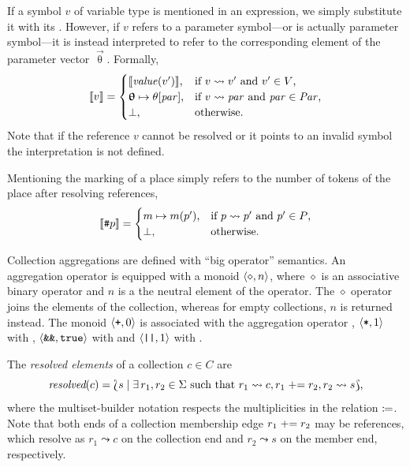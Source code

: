If a symbol \(v\) of variable type is mentioned in an expression, we simply substitute it with its . However, if \(v\) refers to a parameter symbol---or is actually parameter symbol---it is instead interpreted to refer to the corresponding element of the parameter vector \(\vec{\uptheta}\). Formally,
\begin{equation}
  \llbracket v \rrbracket = \begin{cases}
    \llbracket \textrm{\itshape value\/}(v') \rrbracket \text, & \text{if \(v \leadsto v'\) and \(v' \in V\),} \\
    \bm{\mathrm{\uptheta}} \mapsto \theta[\textrm{\itshape par\/}] \text, & \text{if \(v \leadsto \textrm{\itshape par\/}\) and \(\textrm{\itshape par\/} \in \textrm{\itshape Par\/}\),} \\
    {\perp} \text, & \text{otherwise.}
  \end{cases}
\end{equation}
Note that if the reference \(v\) cannot be resolved or it points to an invalid symbol the interpretation is not defined.

Mentioning the marking of a place simply refers to the number of tokens of the place after resolving references,
\begin{equation}
  \llbracket \texttt{\upshape \#} p \rrbracket = \begin{cases}
    m \mapsto m(p')\text, & \text{if \(p \leadsto p'\) and \(p' \in P\),} \\
    {\perp} \text, & \text{otherwise.}
  \end{cases}
\end{equation}

Collection aggregations are defined with \enquote{big operator} semantics. An aggregation operator is equipped with a monoid \(\langle \diamond, n \rangle\), where \(\diamond\) is an associative binary operator and \(n\) is a the neutral element of the operator. The \(\diamond\) operator joins the elements of the collection, whereas for empty collections, \(n\) is returned instead. The monoid \(\langle \texttt{\upshape +}, 0\rangle\) is associated with the aggregation operator , \(\langle \texttt{\upshape *}, 1\rangle\) with , \(\langle \texttt{\upshape \&\&}, \texttt{\upshape true}\rangle\) with  and \(\langle \texttt{\upshape ||}, 1\rangle\) with .

\begin{dfn}
  The \emph{resolved elements} of a collection \(c \in C\) are
  \begin{equation}
    \emph{resolved}(c) = \Lbag s \mid \exists\, r_1, r_2 \in \Sigma \text{ such that } r_1 \leadsto c, r_1 \mathrel{{+}{=}} r_2, r_2 \leadsto s \Rbag \text,
  \end{equation}
  where the multiset-builder notation respects the multiplicities in the relation \(\coloneq\). Note that both ends of a collection membership edge \(r_1 \mathrel{{+}{=}} r_2\) may be references, which resolve as \(r_1 \leadsto c\) on the collection end and \(r_2 \leadsto s\) on the member end, respectively.
\end{dfn}

